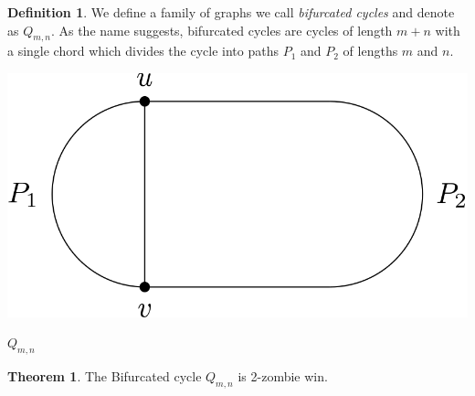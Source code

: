 \documentclass[letterpaper, 10pt]{article}
\begin{document}
\theoremstyle{definition}
\newtheorem{definition}{Definition}
\newtheorem{theorem}{Theorem}
\newtheorem{proposition}{Proposition}
\newtheorem{corollary}{Corollary}
\newtheorem{lemma}{Lemma}
\newtheorem{proofpart}{Part}
\makeatletter
{}
\makeatother

\begin{definition}
 We define a family of graphs we call \emph{bifurcated cycles} and denote as $Q_{m,n}$.
 As the name suggests, bifurcated cycles are cycles of length $m+n$ with a single chord
 which divides the cycle into paths $P_1$ and $P_2$ of lengths $m$ and $n$.
\end{definition}

\begin{center}
 \includegraphics[scale=0.20]{Q_m_n}

 $Q_{m,n}$
\end{center}

\begin{theorem}
The Bifurcated cycle $Q_{m,n}$ is 2-zombie win.
\end{theorem}
\end{document}
